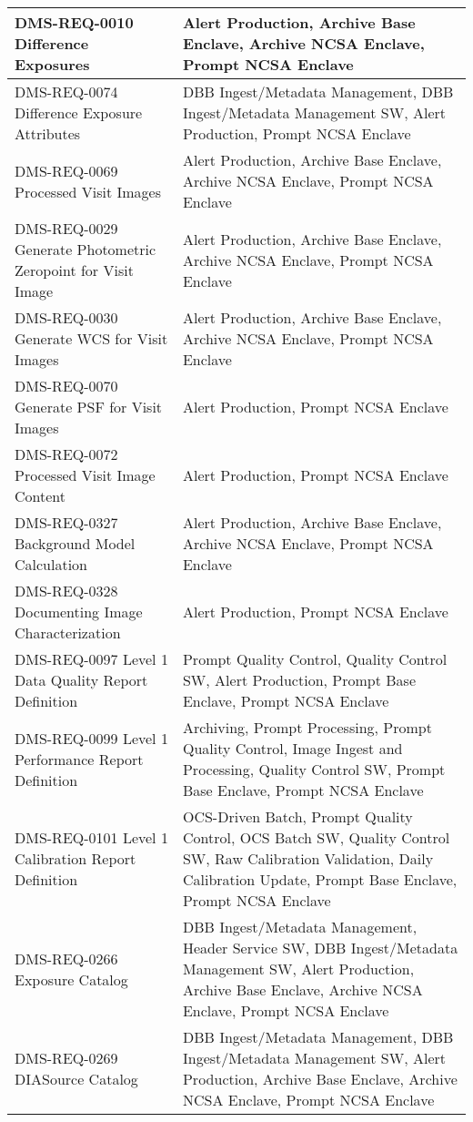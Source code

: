 \begin{xtabular}{p{0.4\textwidth}p{0.55\textwidth}}
DMS-REQ-0010 Difference Exposures & Alert Production, Archive Base Enclave, Archive NCSA Enclave, Prompt NCSA Enclave \\ \hline
DMS-REQ-0074 Difference Exposure Attributes & DBB Ingest/Metadata Management, DBB Ingest/Metadata Management SW, Alert Production, Prompt NCSA Enclave \\ \hline
DMS-REQ-0069 Processed Visit Images & Alert Production, Archive Base Enclave, Archive NCSA Enclave, Prompt NCSA Enclave \\ \hline
DMS-REQ-0029 Generate Photometric Zeropoint for Visit Image & Alert Production, Archive Base Enclave, Archive NCSA Enclave, Prompt NCSA Enclave \\ \hline
DMS-REQ-0030 Generate WCS for Visit Images & Alert Production, Archive Base Enclave, Archive NCSA Enclave, Prompt NCSA Enclave \\ \hline
DMS-REQ-0070 Generate PSF for Visit Images & Alert Production, Prompt NCSA Enclave \\ \hline
DMS-REQ-0072 Processed Visit Image Content & Alert Production, Prompt NCSA Enclave \\ \hline
DMS-REQ-0327 Background Model Calculation & Alert Production, Archive Base Enclave, Archive NCSA Enclave, Prompt NCSA Enclave \\ \hline
DMS-REQ-0328 Documenting Image Characterization & Alert Production, Prompt NCSA Enclave \\ \hline
DMS-REQ-0097 Level 1 Data Quality Report Definition & Prompt Quality Control, Quality Control SW, Alert Production, Prompt Base Enclave, Prompt NCSA Enclave \\ \hline
DMS-REQ-0099 Level 1 Performance Report Definition & Archiving, Prompt Processing, Prompt Quality Control, Image Ingest and Processing, Quality Control SW, Prompt Base Enclave, Prompt NCSA Enclave \\ \hline
DMS-REQ-0101 Level 1 Calibration Report Definition & OCS-Driven Batch, Prompt Quality Control, OCS Batch SW, Quality Control SW, Raw Calibration Validation, Daily Calibration Update, Prompt Base Enclave, Prompt NCSA Enclave \\ \hline
DMS-REQ-0266 Exposure Catalog & DBB Ingest/Metadata Management, Header Service SW, DBB Ingest/Metadata Management SW, Alert Production, Archive Base Enclave, Archive NCSA Enclave, Prompt NCSA Enclave \\ \hline
DMS-REQ-0269 DIASource Catalog & DBB Ingest/Metadata Management, DBB Ingest/Metadata Management SW, Alert Production, Archive Base Enclave, Archive NCSA Enclave, Prompt NCSA Enclave \\ \hline

\end{xtabular}
